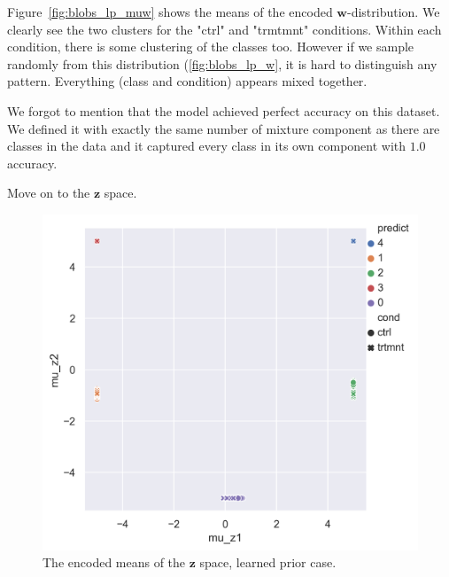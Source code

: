 \documentclass[11pt, a4paper]{report}
\theoremstyle{plain}
\theoremstyle{definition}
\theoremstyle{remark}
\newcommand{\z}{\mathbf{z}}
\newcommand{\w}{\mathbf{w}}
\begin{document}
Figure~\ref{fig:blobs_lp_muw} shows the means of the encoded $\w$-distribution.
We clearly see the two clusters for the "ctrl" and "trmtmnt" conditions.
Within each condition, there is some clustering of the classes too.
However if we sample randomly from this distribution (\ref{fig:blobs_lp_w}, it
is hard to distinguish any pattern. Everything (class and condition) appears
mixed together.


We forgot to mention that the model achieved perfect accuracy on this dataset.
We defined it with exactly the same number of mixture component as there are
classes in the data and it captured every class in its own component with $1.0$
accuracy.

Move on to the $\z$ space.

\begin{figure}[h]
\centering
\includegraphics[width=1.1\textwidth]{images/blobs_cgmvae_learnedprior_mu_z.png}
\caption{The encoded means of the $\z$ space, learned prior case.
}
\label{fig:blobs_lp_muz}
\end{figure}
\end{document}
